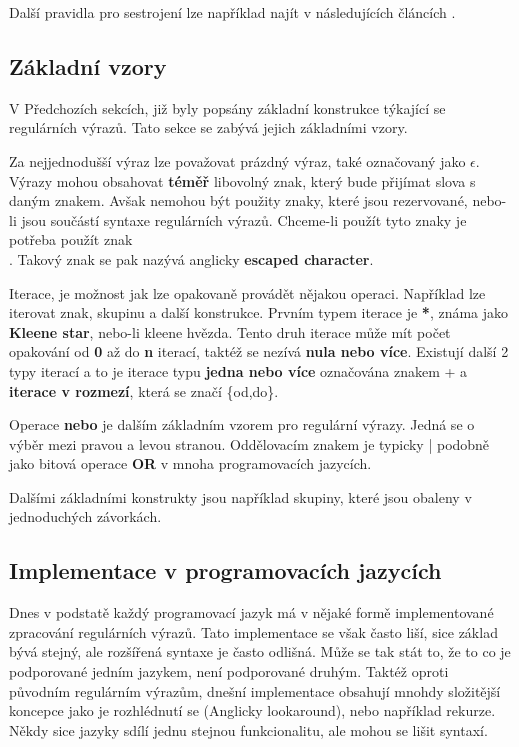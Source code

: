 Další pravidla pro sestrojení lze například najít v následujících článcích \cite{Thompson1,Thompson2}.

\subsection*{Základní vzory}
V Předchozích sekcích, již byly popsány základní konstrukce týkající se regulárních výrazů.
Tato sekce se zabývá jejich základními vzory.

Za nejjednodušší výraz lze považovat prázdný výraz, také označovaný jako $\epsilon$. 
Výrazy mohou obsahovat \textbf{téměř} libovolný znak, který bude přijímat slova s daným znakem. 
Avšak nemohou být použity znaky, které jsou rezervované, nebo-li jsou součástí syntaxe regulárních výrazů.
Chceme-li použít tyto znaky je potřeba použít znak \textbf{\\}. 
Takový znak se pak nazývá anglicky \textbf{escaped character}.

Iterace, je možnost jak lze opakovaně provádět nějakou operaci.
Například lze iterovat znak, skupinu a další konstrukce.
Prvním typem iterace je \textbf{*}, známa jako \textbf{Kleene star}, nebo-li kleene hvězda.
Tento druh iterace může mít počet opakování od \textbf{0} až do \textbf{n} iterací, taktéž se nezívá \textbf{nula nebo více}. 
Existují další 2 typy iterací a to je iterace typu \textbf{jedna nebo více} označována znakem + a \textbf{iterace v rozmezí}, která se značí \{od,do\}.

Operace \textbf{nebo} je dalším základním vzorem pro regulární výrazy. 
Jedná se o výběr mezi pravou a levou stranou. Oddělovacím znakem je typicky | podobně jako bitová operace \textbf{OR} v mnoha programovacích jazycích.

Dalšími základními konstrukty jsou například skupiny, které jsou obaleny v jednoduchých závorkách. 

\subsection*{Implementace v programovacích jazycích}\label{sec:impipl}

Dnes v podstatě každý programovací jazyk má v nějaké formě implementované zpracování regulárních výrazů.
Tato implementace se však často liší, sice základ bývá stejný, ale rozšířená syntaxe je často odlišná.
Může se tak stát to, že to co je podporované jedním jazykem, není podporované druhým.
Taktéž oproti původním regulárním výrazům, dnešní implementace obsahují mnohdy složitější
koncepce jako je rozhlédnutí se (Anglicky lookaround), nebo například rekurze.
Někdy sice jazyky sdílí jednu stejnou funkcionalitu, ale mohou se lišit syntaxí.

